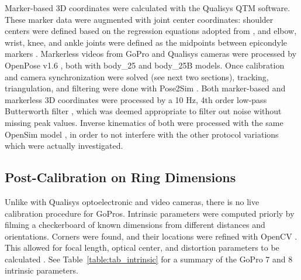 Marker-based 3D coordinates were calculated with the Qualisys QTM software. These marker data were augmented with joint center coordinates: shoulder centers were defined based on the regression equations adopted from \cite{Dumas2018}, and elbow, wrist, knee, and ankle joints were defined as the midpoints between epicondyle markers \cite{Pohl2010}. Markerless videos from GoPro and Qualisys cameras were processed by OpenPose v1.6 \cite{Cao2019}, both with body\_25 and body\_25B models. Once calibration and camera synchronization were solved (see next two sections), tracking, triangulation, and filtering were done with Pose2Sim \cite{Pagnon2022b}. Both marker-based and markerless 3D coordinates were processed by a 10 Hz, 4th order low-pass Butterworth filter \cite{Butterworth1930}, which was deemed appropriate to filter out noise without missing peak values. Inverse kinematics of both were processed with the same OpenSim model \cite{Pagnon2022b}, in order to not interfere with the other protocol variations which were actually investigated.


\subsection{Post-Calibration on Ring Dimensions}\label{calib_pnp}

Unlike with Qualisys optoelectronic and video cameras, there is no live calibration procedure for GoPros. Intrinsic parameters were computed priorly by filming a checkerboard of known dimensions from different distances and orientations. Corners were found, and their locations were refined with OpenCV \cite{Bradski2000}. This allowed for focal length, optical center, and distortion parameters to be calculated \cite{Zhang2000}. See Table~\ref{table:tab_intrinsic} for a summary of the GoPro 7 and 8 intrinsic parameters.

\begin{table}[!ht]
    \centering
    \caption{Intrinsic parameters of the GoPro 7 and GoPro 8 cameras. The optical center was assumed to be at the center of the image. Focal length was supposed to be identical in both directions, the pixel to be square and not skewed, and $6^{th}$ order radial and $2^{nd}$ order tangential distortion coefficient to be null.}
      \label{table:tab_intrinsic}
\end{table}

